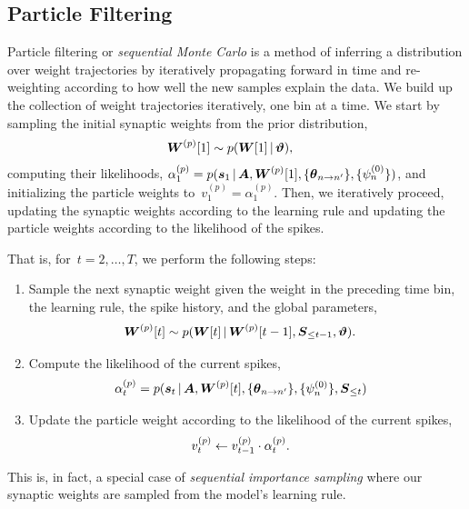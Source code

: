 \subsection{Particle Filtering}
Particle filtering \citep{andrieu2003introduction} or \emph{sequential
  Monte Carlo} is a method of inferring a distribution over weight
trajectories by iteratively propagating forward in time and
re-weighting according to how well the new samples explain the data.
We build up the collection of weight trajectories iteratively, one
bin at a time. We start by sampling the initial synaptic weights
from the prior distribution,
\begin{align*}
  \boldsymbol{W}^{(p)}[1] &\sim p(\boldsymbol{W}[1] \,|\, \boldsymbol{\vartheta}),
\end{align*}
computing their likelihoods, ${\alpha_1^{(p)} = p(\boldsymbol{s}_1 \,|\, \boldsymbol{A}, \boldsymbol{W}^{(p)}[1], \{\boldsymbol{\theta}_{n \to n'}\}, \{\psi_n^{(0)}\} )}$,
and initializing the particle weights to~${v_1^{(p)} = \alpha_1^{(p)}}$.
Then, we iteratively proceed, updating the synaptic weights according to the 
learning rule and updating the particle weights according to the likelihood 
of the spikes. 

That is, for~${t=2, \ldots, T}$, we perform the following steps:
\begin{enumerate}
\item Sample the next synaptic weight given the weight in the
  preceding time bin, the learning rule, the spike history, and the
  global parameters,
  \begin{align*}
    \boldsymbol{W}^{(p)}[t] &\sim p(\boldsymbol{W}[t] \,|\, \boldsymbol{W}^{(p)}[t-1], \boldsymbol{S}_{\leq t-1}, \boldsymbol{\vartheta}).
  \end{align*}

\item Compute the likelihood of the current spikes,
  \begin{align*}
    \alpha_t^{(p)} &= p(\boldsymbol{s}_t \,|\, \boldsymbol{A}, \boldsymbol{W}^{(p)}[t], \{\boldsymbol{\theta}_{n \to n'}\}, \{\psi_n^{(0)}\}, \boldsymbol{S}_{\leq t} )
  \end{align*}
\item Update the particle weight according to the likelihood of the current spikes,
  \begin{align*}
    v_t^{(p)} &\leftarrow v_{t-1}^{(p)} \cdot \alpha_t^{(p)}.
  \end{align*}
\end{enumerate}
This is, in fact, a special case of \emph{sequential importance sampling} where
our synaptic weights are sampled from the model's learning rule.

